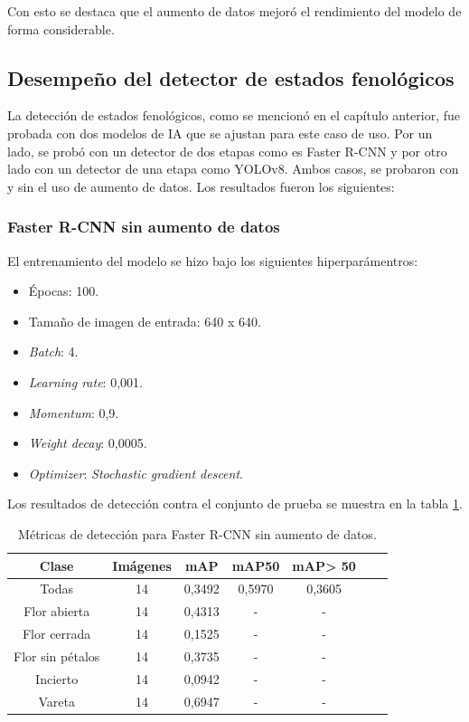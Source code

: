Con esto se destaca que el aumento de datos mejoró el rendimiento del modelo de forma considerable.

\subsection{Desempeño del detector de estados fenológicos}

La detección de estados fenológicos, como se mencionó en el capítulo anterior, fue probada con dos modelos de IA que se ajustan para este caso de uso. Por un lado, se probó con un detector de dos etapas como es Faster R-CNN y por otro lado con un detector de una etapa como YOLOv8. Ambos casos, se probaron con y sin el uso de aumento de datos. Los resultados fueron los siguientes:

\subsubsection{Faster R-CNN sin aumento de datos}

El entrenamiento del modelo se hizo bajo los siguientes hiperparámentros:

\begin{itemize}
	\item Épocas: 100.
    \item Tamaño de imagen de entrada: 640 x 640.
    \item \textit{Batch}: 4.
    \item \textit{Learning rate}: 0,001.
    \item \textit{Momentum}: 0,9.
    \item \textit{Weight decay}: 0,0005.
    \item \textit{Optimizer}: \textit{Stochastic gradient descent}.
\end{itemize}

Los resultados de detección contra el conjunto de prueba se muestra en la tabla \ref{tab:resultadosFasterSinAug}.

\begin{table}[h]
	\centering
	\caption{Métricas de detección para Faster R-CNN sin aumento de datos.}
	\begin{tabular}{c c c c c c c}    
		\toprule
		\textbf{Clase}&\textbf{Imágenes}&\textbf{mAP}&\textbf{mAP50}&\textbf{mAP> 50}\\
		\midrule
		Todas & 14 & 0,3492 & 0,5970 & 0,3605\\
		Flor abierta & 14 & 0,4313 & - & - \\
		Flor cerrada & 14 & 0,1525 & - & - \\
		Flor sin pétalos & 14 & 0,3735 & - & - \\
		Incierto & 14 & 0,0942 & - & - \\
		Vareta & 14 & 0,6947 & - & - \\		
		\bottomrule
		\hline
	\end{tabular}
	\label{tab:resultadosFasterSinAug}
\end{table}

